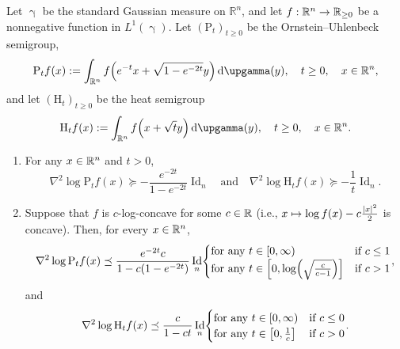 \documentclass[AHL,Unicode,longabstracts]{cedram}
\newcommand{\R}{\mathbb R}
\DeclareMathOperator{\Id}{Id}
\newcommand{\Pheat}{\mathrm{P}}
\newcommand{\Hheat}{\mathrm{H}}
\newcommand{\dd}{n}
\newcommand{\conv}{c}
\newcommand{\density}{f}
\newcommand*\diff{\mathop{}\!\mathrm{d}}
\newcommand{\Gaussian}{\upgamma}
\renewcommand*{\to}{\mathchoice{\longrightarrow}{\rightarrow}{\rightarrow}{\rightarrow}}
\let\oldmapsto\mapsto
\renewcommand*{\mapsto}{\mathchoice{\longmapsto}{\oldmapsto}{\oldmapsto}{\oldmapsto}}
\let\originalleft\left
\let\originalright\right
\renewcommand{\left}{\mathopen{}\mathclose\bgroup\originalleft}
\renewcommand{\right}{\aftergroup\egroup\originalright}
\let\oldin\in
\renewcommand{\in}{\mathchoice{\oldin}{\oldin}{\,\oldin\,}{\,\oldin\,}}
\begin{document}
\begin{prop}\label{prop:OU_smooth_appendix}
Let $\Gaussian$ be the standard Gaussian measure on $\R^{\dd}$, and let $f:\R^{\dd}\to \R_{\ge 0}$ be a nonnegative function in $L^1(\Gaussian)$. Let $(\Pheat_t)_{t\ge 0}$ be the Ornstein--Uhlenbeck semigroup,
\begin{equation}\label{eq:OU_def_prop_appendix}
\Pheat_t\density(x):=\int_{\R^{\dd}} \density\left(e^{-t}x+\sqrt{1-e^{-2t}}y\right)\diff \Gaussian(y),\quad t\ge 0,\quad x\in \R^{\dd},
\end{equation}
and let $(\Hheat_t)_{t\ge 0}$ be the heat semigroup
\begin{equation}\label{eq:heat_def_prop_appendix}
\Hheat_t\density(x):=\int_{\R^{\dd}} \density\left(x+\sqrt{t}y\right)\diff \Gaussian(y),\quad t\ge 0,\quad x\in \R^{\dd}.
\end{equation}
\begin{enumerate}
\item\label{propA.2.1} For any $x\in \R^{\dd}$ and $t>0$,
\begin{equation}\label{eq:less_lc_appendix}
\nabla^2\log\Pheat_t\density(x) \succeq -\frac{e^{-2t}}{1-e^{-2t}} \Id_{\dd}\quad\text{and}\quad \nabla^2\log\Hheat_t\density(x) \succeq -\frac{1}{t}\Id_{\dd}.
\end{equation}
\item\label{propA.2.2} Suppose that $\density$ is $\conv$-log-concave for some $\conv\in \R$ (i.e., $x\mapsto \log \density(x)-\conv\frac{|x|^2}{2}$ is concave). Then, for every $x\in \R^{\dd}$,
\begin{equation}\label{eq:beta_log-concave_OU_appendix}
\nabla^2\log\Pheat_t\density(x)\preceq \frac{ e^{-2t}\conv}{1-\conv(1-e^{-2t})} \Id_{\dd}
\begin{cases}
\text{for any }t\in [0,\infty) &\text{if }\conv\le 1\\
\text{for any }t\in \left[0,\log\left(\sqrt{\frac{\conv}{\conv-1}}\right)\right] &\text{if }\conv >1
\end{cases},
\end{equation}
and
\begin{equation}\label{eq:beta_log-concave_heat_appendix}
\nabla^2\log\Hheat_t\density(x)\preceq \frac{\conv}{1-\conv t}\Id_{\dd}
\begin{cases}
\text{for any }t\in [0,\infty) &\text{if }\conv\le 0\\
\text{for any }t\in \left[0,\frac{1}{\conv}\right] &\text{if }\conv >0
\end{cases}.
\end{equation}


\end{enumerate}
\end{prop}
\end{document}
